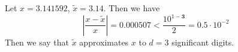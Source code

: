 \begin{example}
    Let $x = 3.141592$, $\tilde{x} = 3.14$. Then we have
    $$ \left| \frac{x - \tilde{x}}{x} \right| = 0.000507 < \frac{10^{1-\mathbf{3}}}{2} = 0.5 \cdot 10^{-2} $$
    Then we say that $\tilde{x}$ approximates $x$ to $d = 3$ significant digits.
\end{example}